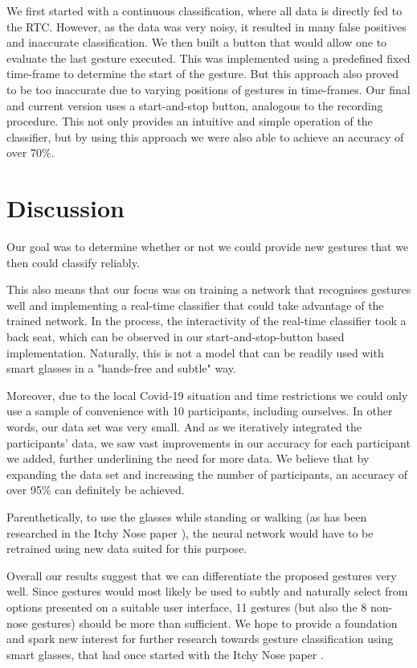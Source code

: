 \documentclass[runningheads]{llncs}
\begin{document}
We first started with a continuous classification, where all data is directly fed to the RTC. However, as the data was very noisy, it resulted in many false positives and inaccurate classification. We then built a button that would allow one to evaluate the last gesture executed. This was implemented using a predefined fixed time-frame to determine the start of the gesture. But this approach also proved to be too inaccurate due to varying positions of gestures in time-frames. Our final and current version uses a start-and-stop button, analogous to the recording procedure. This not only provides an intuitive and simple operation of the classifier, but by using this approach we were also able to achieve an accuracy of over 70\%.

\section{Discussion}
Our goal was to determine whether or not we could provide new gestures that we then could classify reliably.

This also means that our focus was on training a network that recognises gestures well and implementing a real-time classifier that could take advantage of the trained network. In the process, the interactivity of the real-time classifier took a back seat, which can be observed in our start-and-stop-button based implementation. Naturally, this is not a model that can be readily used with smart glasses in a "hands-free and subtle" way.

Moreover, due to the local Covid-19 situation and time restrictions we could only use a sample of convenience with 10 participants, including ourselves. In other words, our data set was very small. And as we iteratively integrated the participants' data, we saw vast improvements in our accuracy for each participant we added, further underlining the need for more data. We believe that by expanding the data set and increasing the number of participants, an accuracy of over 95\% can definitely be achieved.

Parenthetically, to use the glasses while standing or walking (as has been researched in the Itchy Nose paper \cite{10.1145/3123021.3123060}), the neural network would have to be retrained using new data suited for this purpose.

Overall our results suggest that we can differentiate the proposed gestures very well. Since gestures would most likely be used to subtly and naturally select from options presented on a suitable user interface, 11 gestures (but also the 8 non-nose gestures) should be more than sufficient. We hope to provide a foundation and spark new interest for further research towards gesture classification using smart glasses, that had once started with the Itchy Nose paper \cite{10.1145/3123021.3123060}.
\end{document}
